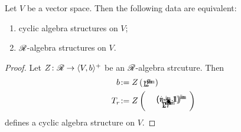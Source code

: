\begin{theorem}\label{thm:gc-cyc}
  Let $V$ be a vector space. Then the following data are equivalent:
  \begin{enumerate}
  \item cyclic algebra structures on $V$;
  \item $\mathscr{R}_{}$-algebra structures on $V$.
  \end{enumerate}
\end{theorem}
\begin{proof} Let $Z\colon\mathscr{R}_{}\to\langle V,b\rangle^+$ be an $\mathscr{R}_{}$-algebra strcuture.
  Then
  \begin{align*}
    b &\joinrel:= Z\left(\xy*!LC\xybox{%
        \vloop~{(0,0.5)}{(1,0.5)}{(0,-0.5)}{(1,-0.5)},(0,-0.7)*{1^{\textrm{in}}}%
        ,(1,-0.7)*{2^{\textrm{in}}}}
      \endxy\right)
    \\
    T_r &\joinrel:= Z\left(\xy*!LC\xybox{
        (0,1)*{\bullet};%
        (-1,0)*+{1^{\textrm{in}}}**\dir{-},(-0.5,0)*+{2^{\textrm{in}}}**\dir{-},%
        (0,0.5)*+{\ldots},(1,0)*+{i^{\textrm{in}}}**\dir{-},%
        (-1,2)*+{r^{\textrm{in}}}**\dir{-}%
        ,(-0.5,2)*+{\ \ \ (r-1)^{\textrm{in}}}**\dir{-},%
        (0,1.5)*+{\ldots},(1,2)*+{(i+1)^{\textrm{in}}}**\dir{-},%
        }\endxy\right) 
  \end{align*}
  defines a cyclic algebra structure on $V$.
  

\end{proof}
